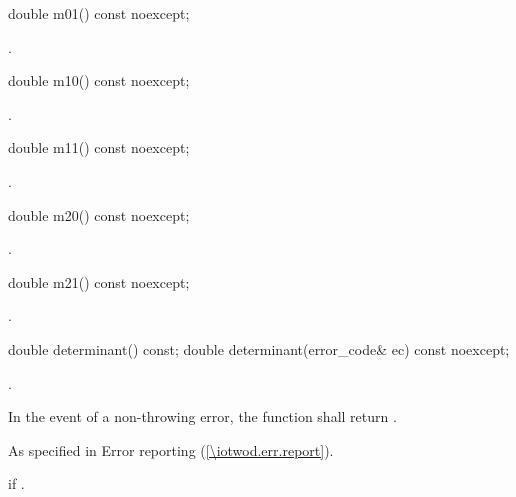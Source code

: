 \begin{itemdecl}
	double m01() const noexcept;
\end{itemdecl}
\begin{itemdescr}
	\pnum
	\returns
	.
\end{itemdescr}

\begin{itemdecl}
	double m10() const noexcept;
\end{itemdecl}
\begin{itemdescr}
	\pnum
	\returns
	.
\end{itemdescr}

\begin{itemdecl}
	double m11() const noexcept;
\end{itemdecl}
\begin{itemdescr}
	\pnum
	\returns
	.
\end{itemdescr}

\begin{itemdecl}
	double m20() const noexcept;
\end{itemdecl}
\begin{itemdescr}
	\pnum
	\returns
	.
\end{itemdescr}

\begin{itemdecl}
	double m21() const noexcept;
\end{itemdecl}
\begin{itemdescr}
	\pnum
	\returns
	.
\end{itemdescr}

\begin{itemdecl}
double determinant() const;
double determinant(error_code& ec) const noexcept;
\end{itemdecl}
\begin{itemdescr}
	\pnum
	\returns
	.
	
	\pnum
	In the event of a non-throwing error, the function shall return .

	\pnum
	\throws
	As specified in Error reporting (\ref{\iotwod.err.report}).

	\pnum
	\errors
	 if .
\end{itemdescr}

